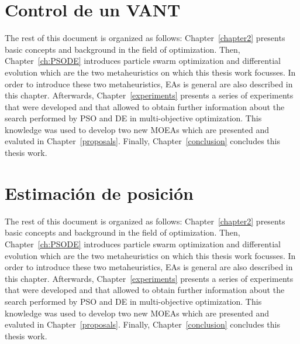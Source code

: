 \section{Control de un VANT}

The rest of this document is organized as follows: Chapter~\ref{chapter2} presents basic concepts and background in the field of optimization. Then, Chapter~\ref{ch:PSODE} introduces particle swarm optimization and differential evolution which are the two metaheuristics on which this thesis work focusses. In order to introduce these two metaheuristics, EAs is general are also described in this chapter. Afterwards, Chapter~\ref{experiments} presents a series of experiments that were developed and that allowed to obtain further information about the search performed by PSO and DE in multi-objective optimization. This knowledge was used to develop two new MOEAs which are presented and evaluted in Chapter~\ref{proposals}. Finally, Chapter~\ref{conclusion} concludes this thesis work.

\section{Estimación de posición}

The rest of this document is organized as follows: Chapter~\ref{chapter2} presents basic concepts and background in the field of optimization. Then, Chapter~\ref{ch:PSODE} introduces particle swarm optimization and differential evolution which are the two metaheuristics on which this thesis work focusses. In order to introduce these two metaheuristics, EAs is general are also described in this chapter. Afterwards, Chapter~\ref{experiments} presents a series of experiments that were developed and that allowed to obtain further information about the search performed by PSO and DE in multi-objective optimization. This knowledge was used to develop two new MOEAs which are presented and evaluted in Chapter~\ref{proposals}. Finally, Chapter~\ref{conclusion} concludes this thesis work.
